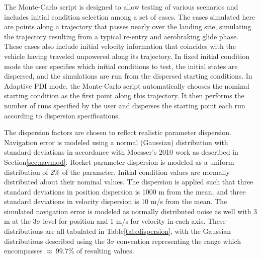 The Monte-Carlo script is designed to allow testing of various scenarios and includes initial condition selection among a set of cases. The cases simulated here are points along a trajectory that passes nearly over the landing site, simulating the trajectory resulting from a typical re-entry and aerobraking glide phase. These cases also include initial velocity information that coincides with the vehicle having traveled unpowered along its trajectory. In fixed initial condition mode the user specifies which initial conditions to test, the initial states are dispersed, and the simulations are run from the dispersed starting conditions. In Adaptive PDI mode, the Monte-Carlo script automatically chooses the nominal starting condition as the first point along this trajectory. It then performs the number of runs specified by the user and disperses the starting point each run according to dispersion specifications.

The dispersion factors are chosen to reflect realistic parameter dispersion. Navigation error is modeled using a normal (Gaussian) distribution with standard deviations in accordance with Moesser's 2010\:\cite{MOESSER} work as described in Section\:\ref{sec:navmod}. Rocket parameter dispersion is modeled as a uniform distribution of 2\% of the parameter. Initial condition values are normally distributed about their nominal values. The dispersion is applied such that three standard deviations in position dispersion is 1000 m from the mean, and three standard deviations in velocity dispersion is 10 m/s from the mean. The simulated navigation error is modeled as normally distributed noise as well with 3 m at the $3\sigma$ level for position and 1 m/s for velocity in each axis. These distributions are all tabulated in Table\:\ref{tab:dispersion}, with the Gaussian distributions described using the $3\sigma$ convention representing the range which encompasses $\approx\:99.7\%$ of resulting values. 

